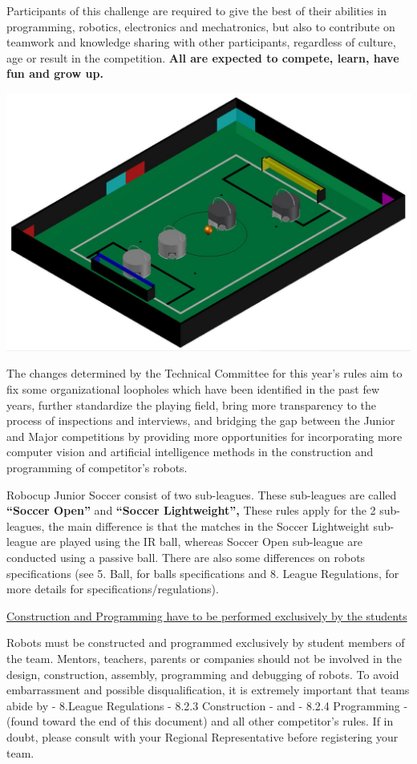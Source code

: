 \documentclass{article}
\begin{document}
Participants of this challenge are required to give the best of their abilities in programming, robotics, electronics and mechatronics, but also to contribute on teamwork and knowledge sharing with other participants, regardless of culture, age or result in the competition. \textbf{All are expected to compete, learn, have fun and grow up.}

\includegraphics[width=1\textwidth]{media/image1.jpeg}

The changes determined by the Technical Committee for this year's rules aim to fix some organizational loopholes which have been identified in the past few years, further standardize the playing field, bring more transparency to the process of inspections and interviews, and bridging the gap between the Junior and Major competitions by providing more opportunities for incorporating more computer vision and artificial intelligence methods in the construction and programming of competitor's robots.

Robocup Junior Soccer consist of two sub-leagues. These sub-leagues are called \textbf{``Soccer Open''} and \textbf{``Soccer Lightweight'',} These rules apply for the 2 sub-leagues, the main difference is that the matches in the Soccer Lightweight sub-league are played using the IR ball, whereas Soccer Open sub-league are conducted using a passive ball. There are also some differences on robots specifications (see 5. Ball, for balls specifications and 8. League Regulations, for more details for specifications/regulations).

\underline{Construction and Programming have to be performed exclusively by the students}

Robots must be constructed and programmed exclusively by student members of the team. Mentors, teachers, parents or companies should not be involved in the design, construction, assembly, programming and debugging of robots. To avoid embarrassment and possible disqualification, it is extremely important that teams abide by - 8.League Regulations - 8.2.3 Construction - and - 8.2.4 Programming - (found toward the end of this document) and all other competitor's rules. If in doubt, please consult with your Regional Representative before registering your team.
\end{document}

